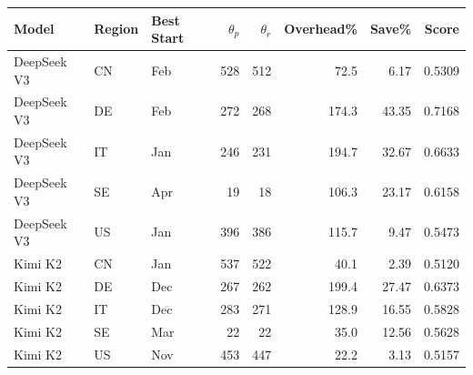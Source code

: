 \begin{tabular}{lllrrrrr}
\toprule
Model & Region & Best Start & $\theta_p$ & $\theta_r$ & Overhead\% & Save\% & Score \\
\midrule
DeepSeek V3 & CN & Feb & 528 & 512 & 72.5 & 6.17 & 0.5309 \\
DeepSeek V3 & DE & Feb & 272 & 268 & 174.3 & 43.35 & 0.7168 \\
DeepSeek V3 & IT & Jan & 246 & 231 & 194.7 & 32.67 & 0.6633 \\
DeepSeek V3 & SE & Apr & 19 & 18 & 106.3 & 23.17 & 0.6158 \\
DeepSeek V3 & US & Jan & 396 & 386 & 115.7 & 9.47 & 0.5473 \\
Kimi K2 & CN & Jan & 537 & 522 & 40.1 & 2.39 & 0.5120 \\
Kimi K2 & DE & Dec & 267 & 262 & 199.4 & 27.47 & 0.6373 \\
Kimi K2 & IT & Dec & 283 & 271 & 128.9 & 16.55 & 0.5828 \\
Kimi K2 & SE & Mar & 22 & 22 & 35.0 & 12.56 & 0.5628 \\
Kimi K2 & US & Nov & 453 & 447 & 22.2 & 3.13 & 0.5157 \\
\bottomrule
\end{tabular}
